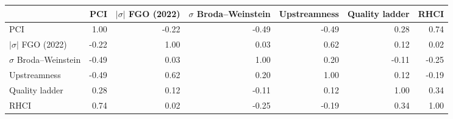 \begin{tabular}{lrrrrrr}
\toprule
 & PCI & $|\sigma|$ FGO (2022) & $\sigma$ Broda--Weinstein & Upstreamness & Quality ladder & RHCI \\
\midrule
PCI & 1.00 & -0.22 & -0.49 & -0.49 & 0.28 & 0.74 \\
$|\sigma|$ FGO (2022) & -0.22 & 1.00 & 0.03 & 0.62 & 0.12 & 0.02 \\
$\sigma$ Broda--Weinstein & -0.49 & 0.03 & 1.00 & 0.20 & -0.11 & -0.25 \\
Upstreamness & -0.49 & 0.62 & 0.20 & 1.00 & 0.12 & -0.19 \\
Quality ladder & 0.28 & 0.12 & -0.11 & 0.12 & 1.00 & 0.34 \\
RHCI & 0.74 & 0.02 & -0.25 & -0.19 & 0.34 & 1.00 \\
\bottomrule
\end{tabular}
